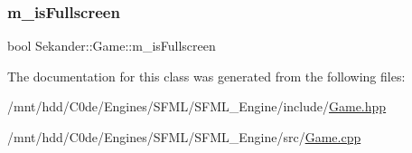 \subsubsection{\texorpdfstring{m\+\_\+is\+Fullscreen}{m\_isFullscreen}}
{\footnotesize\ttfamily bool Sekander\+::\+Game\+::m\+\_\+is\+Fullscreen\hspace{0.3cm}{\ttfamily [private]}}



The documentation for this class was generated from the following files\+:\begin{DoxyCompactItemize}
\item 
/mnt/hdd/\+C0de/\+Engines/\+S\+F\+M\+L/\+S\+F\+M\+L\+\_\+\+Engine/include/\hyperlink{Game_8hpp}{Game.\+hpp}\item 
/mnt/hdd/\+C0de/\+Engines/\+S\+F\+M\+L/\+S\+F\+M\+L\+\_\+\+Engine/src/\hyperlink{Game_8cpp}{Game.\+cpp}\end{DoxyCompactItemize}
